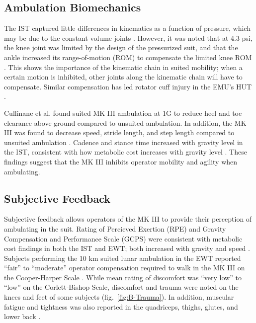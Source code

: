 \documentclass[defaultstyle,11pt]{comps}
\begin{document}
\hypertarget{ambulation-biomechanics}{%
\subsection{Ambulation Biomechanics}\label{ambulation-biomechanics}}

The IST captured little differences in kinematics as a function of pressure, which may be due to the constant volume joints \citep{Norcross2010}.
However, it was noted that at 4.3 psi, the knee joint was limited by the design of the pressurized suit, and that the ankle increased its range-of-motion (ROM) to compensate the limited knee ROM \citep{Norcross2010}.
This shows the importance of the kinematic chain in suited mobility; when a certain motion is inhibited, other joints along the kinematic chain will have to compensate.
Similar compensation has led rotator cuff injury in the EMU's HUT \citep{Williams2003}.

Cullinane et al. \citep{Cullinane2017a} found suited MK III ambulation at 1G to reduce heel and toe clearance above ground compared to unsuited ambulation.
In addition, the MK III was found to decrease speed, stride length, and step length compared to unsuited ambulation \citep{Cullinane2017a}.
Cadence and stance time increased with gravity level in the IST, consistent with how metabolic cost increases with gravity level \citep{Norcross2010}.
These findings suggest that the MK III inhibits operator mobility and agility when ambulating.

\hypertarget{subjective-feedback}{%
\subsection{Subjective Feedback}\label{subjective-feedback}}

Subjective feedback allows operators of the MK III to provide their perception of ambulating in the suit.
Rating of Percieved Exertion (RPE) and Gravity Compensation and Performance Scale (GCPS) were consistent with metabolic cost findings in both the IST and EWT; both increased with gravity and speed \citep{Norcross2009, Norcross2010}.
Subjects performing the 10 km suited lunar ambulation in the EWT reported ``fair'' to ``moderate'' operator compensation required to walk in the MK III on the Cooper-Harper Scale \citep{Norcross2009}.
While mean rating of discomfort was ``very low'' to ``low'' on the Corlett-Bishop Scale, discomfort and trauma were noted on the knees and feet of some subjects \citep{Norcross2009} (fig.~\ref{fig:B-Trauma}).
In addition, muscular fatigue and tightness was also reported in the quadriceps, thighs, glutes, and lower back \citep{Norcross2009}.
\end{document}
